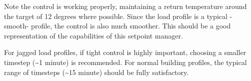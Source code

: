 Note the control is working properly, maintaining a return temperature around the target of 12 degrees where possible. Since the load profile is a typical -smooth- profile, the control is also much smoother. This should be a good representation of the capabilities of this setpoint manager.

For jagged load profiles, if tight control is highly important, choosing a smaller timestep (\textasciitilde{}1 minute) is recommended. For normal building profiles, the typical range of timesteps (\textasciitilde{}15 minute) should be fully satisfactory.
